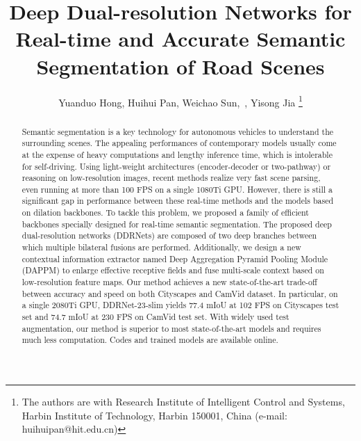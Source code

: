 \documentclass[journal]{IEEEtran}
\begin{document}
\title{Deep Dual-resolution Networks for Real-time and Accurate Semantic Segmentation of Road Scenes}

\author{Yuanduo Hong, Huihui Pan, Weichao Sun,~, Yisong Jia \thanks{The authors are with Research Institute of Intelligent Control and Systems,
Harbin Institute of Technology, Harbin 150001, China (e-mail: huihuipan@hit.edu.cn)}}



















\maketitle

\begin{abstract}
Semantic segmentation is a key technology for autonomous vehicles to understand the surrounding scenes. The appealing performances of contemporary models usually come at the expense of heavy computations and lengthy inference time, which is intolerable for self-driving. Using light-weight architectures (encoder-decoder or two-pathway) or reasoning on low-resolution images, recent methods realize very fast scene parsing, even running at more than 100 FPS on a single 1080Ti GPU. However, there is still a significant gap in performance between these real-time methods and the models based on dilation backbones. To tackle this problem, we proposed a family of efficient backbones specially designed for real-time semantic segmentation. The proposed deep dual-resolution networks (DDRNets) are composed of two deep branches between which multiple bilateral fusions are performed. Additionally, we design a new contextual information extractor named Deep Aggregation Pyramid Pooling Module (DAPPM) to enlarge effective receptive fields and fuse multi-scale context based on low-resolution feature maps. Our method achieves a new state-of-the-art trade-off between accuracy and speed on both Cityscapes and CamVid dataset. In particular, on a single 2080Ti GPU, DDRNet-23-slim yields 77.4 mIoU at 102 FPS on Cityscapes test set and 74.7 mIoU at 230 FPS on CamVid test set. With widely used test augmentation, our method is superior to most state-of-the-art models and requires much less computation. Codes and trained models are available online.

\end{abstract}
\end{document}

